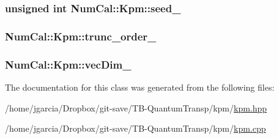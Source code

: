 \hypertarget{classNumCal_1_1Kpm_a1ffffb62aa49a0428a7959889607c873}{
\subsubsection[{seed\+\_\+}]{\setlength{\rightskip}{0pt plus 5cm}unsigned int Num\+Cal\+::\+Kpm\+::seed\+\_\+\hspace{0.3cm}{\ttfamily [private]}}}\label{classNumCal_1_1Kpm_a1ffffb62aa49a0428a7959889607c873}
\hypertarget{classNumCal_1_1Kpm_a9306617bc9ed19bee31a900d916601f2}{
\subsubsection[{trunc\+\_\+order\+\_\+}]{ Num\+Cal\+::\+Kpm\+::trunc\+\_\+order\+\_\+\hspace{0.3cm}{\ttfamily [private]}}}\label{classNumCal_1_1Kpm_a9306617bc9ed19bee31a900d916601f2}
\hypertarget{classNumCal_1_1Kpm_a4ac4a7a755edc98dcecbe0871b331d60}{
\subsubsection[{vec\+Dim\+\_\+}]{ Num\+Cal\+::\+Kpm\+::vec\+Dim\+\_\+\hspace{0.3cm}{\ttfamily [private]}}}\label{classNumCal_1_1Kpm_a4ac4a7a755edc98dcecbe0871b331d60}


The documentation for this class was generated from the following files\+:\begin{DoxyCompactItemize}
\item 
/home/jgarcia/\+Dropbox/git-\/save/\+T\+B-\/\+Quantum\+Transp/kpm/\hyperlink{kpm_8hpp}{kpm.\+hpp}\item 
/home/jgarcia/\+Dropbox/git-\/save/\+T\+B-\/\+Quantum\+Transp/kpm/\hyperlink{kpm_8cpp}{kpm.\+cpp}\end{DoxyCompactItemize}
